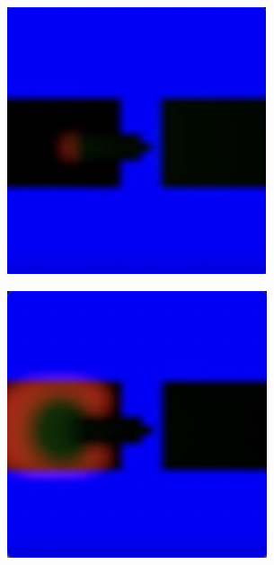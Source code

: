 \begin{figure}
\begin{subfigure}{0.24\textwidth}
	\end{subfigure}
    \begin{subfigure}{0.24\textwidth}
		\includegraphics[width=\linewidth]{diode/hard/Screenshot 2024-03-09 at 16.23.55.png} 
	\end{subfigure}
    \begin{subfigure}{0.24\textwidth}
		\includegraphics[width=\linewidth]{diode/hard/Screenshot 2024-03-09 at 16.24.01.png} 
	\end{subfigure}


\end{figure}

